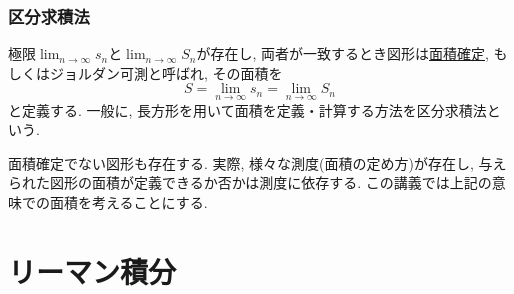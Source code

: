 

\begin{frame}
\frametitle{区分求積法}

\begin{Def}
極限$\displaystyle \lim_{n\to \infty}s_n$と$\displaystyle \lim_{n\to \infty}S_n$が存在し, 
両者が一致するとき図形は\underline{面積確定}, もしくはジョルダン可測と呼ばれ,  
その面積を
$$
S= \lim_{n\to \infty}s_n=\lim_{n\to \infty}S_n
$$
と定義する. 
一般に, 長方形を用いて面積を定義・計算する方法を区分求積法という. 
\end{Def}

面積確定でない図形も存在する. 
実際, 様々な測度(面積の定め方)が存在し, 与えられた図形の面積が定義できるか否かは測度に依存する. 
この講義では上記の意味での面積を考えることにする. 


\end{frame}



\section{リーマン積分}

